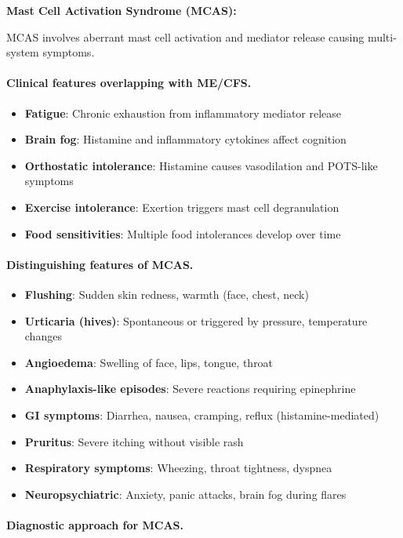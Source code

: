 \begin{observation}
\textbf{Mast Cell Activation Syndrome (MCAS):}

MCAS involves aberrant mast cell activation and mediator release causing multi-system symptoms.

\paragraph{Clinical features overlapping with ME/CFS.}
\begin{itemize}
    \item \textbf{Fatigue}: Chronic exhaustion from inflammatory mediator release
    \item \textbf{Brain fog}: Histamine and inflammatory cytokines affect cognition
    \item \textbf{Orthostatic intolerance}: Histamine causes vasodilation and POTS-like symptoms
    \item \textbf{Exercise intolerance}: Exertion triggers mast cell degranulation
    \item \textbf{Food sensitivities}: Multiple food intolerances develop over time
\end{itemize}

\paragraph{Distinguishing features of MCAS.}
\begin{itemize}
    \item \textbf{Flushing}: Sudden skin redness, warmth (face, chest, neck)
    \item \textbf{Urticaria (hives)}: Spontaneous or triggered by pressure, temperature changes
    \item \textbf{Angioedema}: Swelling of face, lips, tongue, throat
    \item \textbf{Anaphylaxis-like episodes}: Severe reactions requiring epinephrine
    \item \textbf{GI symptoms}: Diarrhea, nausea, cramping, reflux (histamine-mediated)
    \item \textbf{Pruritus}: Severe itching without visible rash
    \item \textbf{Respiratory symptoms}: Wheezing, throat tightness, dyspnea
    \item \textbf{Neuropsychiatric}: Anxiety, panic attacks, brain fog during flares
\end{itemize}

\paragraph{Diagnostic approach for MCAS.}


\end{observation}
